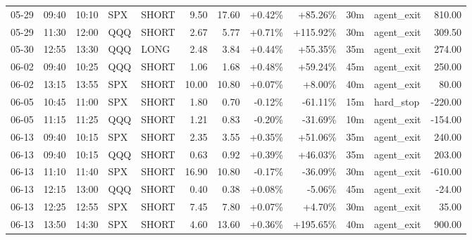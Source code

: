 \documentclass[11pt,a4paper,twoside]{article}
\begin{document}
\begin{center}
\begin{longtable}{>{\color{txtmain}}l l l l l r r r r r >{\color{txtmain}}l r}
05-29 & 09:40 & 10:10 & SPX & SHORT & 9.50 & 17.60 & \textcolor{wingreen}{+0.42\%} & \textcolor{wingreen}{+85.26\%} & 30m & agent\_exit & \textcolor{wingreen}{810.00} \\
05-29 & 11:30 & 12:00 & QQQ & SHORT & 2.67 & 5.77 & \textcolor{wingreen}{+0.71\%} & \textcolor{wingreen}{+115.92\%} & 30m & agent\_exit & \textcolor{wingreen}{309.50} \\
05-30 & 12:55 & 13:30 & QQQ & LONG & 2.48 & 3.84 & \textcolor{wingreen}{+0.44\%} & \textcolor{wingreen}{+55.35\%} & 35m & agent\_exit & \textcolor{wingreen}{274.00} \\
06-02 & 09:40 & 10:25 & QQQ & SHORT & 1.06 & 1.68 & \textcolor{wingreen}{+0.48\%} & \textcolor{wingreen}{+59.24\%} & 45m & agent\_exit & \textcolor{wingreen}{250.00} \\
06-02 & 13:15 & 13:55 & SPX & SHORT & 10.00 & 10.80 & \textcolor{wingreen}{+0.07\%} & \textcolor{wingreen}{+8.00\%} & 40m & agent\_exit & \textcolor{wingreen}{80.00} \\
06-05 & 10:45 & 11:00 & SPX & SHORT & 1.80 & 0.70 & \textcolor{lossred}{-0.12\%} & \textcolor{lossred}{-61.11\%} & 15m & hard\_stop & \textcolor{lossred}{-220.00} \\
06-05 & 11:15 & 11:25 & QQQ & SHORT & 1.21 & 0.83 & \textcolor{lossred}{-0.20\%} & \textcolor{lossred}{-31.69\%} & 10m & agent\_exit & \textcolor{lossred}{-154.00} \\
06-13 & 09:40 & 10:15 & SPX & SHORT & 2.35 & 3.55 & \textcolor{wingreen}{+0.35\%} & \textcolor{wingreen}{+51.06\%} & 35m & agent\_exit & \textcolor{wingreen}{240.00} \\
06-13 & 09:40 & 10:15 & QQQ & SHORT & 0.63 & 0.92 & \textcolor{wingreen}{+0.39\%} & \textcolor{wingreen}{+46.03\%} & 35m & agent\_exit & \textcolor{wingreen}{203.00} \\
06-13 & 11:10 & 11:40 & SPX & SHORT & 16.90 & 10.80 & \textcolor{lossred}{-0.17\%} & \textcolor{lossred}{-36.09\%} & 30m & agent\_exit & \textcolor{lossred}{-610.00} \\
06-13 & 12:15 & 13:00 & QQQ & SHORT & 0.40 & 0.38 & \textcolor{wingreen}{+0.08\%} & \textcolor{lossred}{-5.06\%} & 45m & agent\_exit & \textcolor{lossred}{-24.00} \\
06-13 & 12:25 & 12:55 & SPX & SHORT & 7.45 & 7.80 & \textcolor{wingreen}{+0.07\%} & \textcolor{wingreen}{+4.70\%} & 30m & agent\_exit & \textcolor{wingreen}{35.00} \\
06-13 & 13:50 & 14:30 & SPX & SHORT & 4.60 & 13.60 & \textcolor{wingreen}{+0.36\%} & \textcolor{wingreen}{+195.65\%} & 40m & agent\_exit & \textcolor{wingreen}{900.00} \\

\end{longtable}
\end{center}
\end{document}
